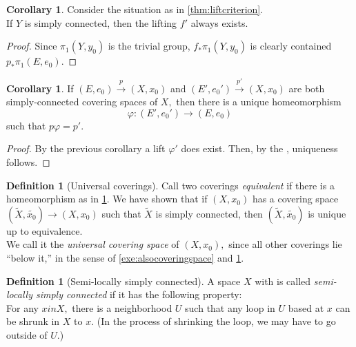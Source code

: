 \documentclass[12pt]{article}
\theoremstyle{definition}
\numberwithin{thm}{section}
\newtheorem{defn}[thm]{Definition}
\newtheorem{cor}[thm]{Corollary}
\begin{document}
\begin{cor} \label{cor:liftexists}
	Consider the situation as in \cref{thm:liftcriterion}. \\
	If $Y$ is simply connected, then the lifting $f'$ always exists.
\end{cor}
\begin{proof} 
	Since $\pi_1(Y, y_0)$ is the trivial group, $f_*\pi_1(Y, y_0)$ is clearly contained $p_*\pi_1(E, e_0).$	
\end{proof}

\begin{cor} \label{cor:equivcoverings}
	If $(E, e_0) \overset{p}{\longrightarrow} (X, x_0)$ and $(E', e_0') \overset{p'}{\longrightarrow} (X, x_0)$ are both simply-connected covering spaces of $X,$ then there is a unique homeomorphism
	\begin{equation*} 
		\varphi:(E', e_0') \to (E, e_0)
	\end{equation*}
	such that $p\varphi = p'.$
\end{cor}
\begin{proof} 
	By the previous corollary a lift $\varphi'$ does exist. Then, by the , uniqueness follows.
\end{proof}

\begin{defn}[Universal coverings]
	Call two coverings \emph{equivalent} if there is a homeomorphism as in \cref{cor:equivcoverings}. We have shown that if $(X, x_0)$ has a covering space $(\tilde{X}, \widetilde{x_0}) \to (X, x_0)$ such that $\tilde{X}$ is simply connected, then $(\tilde{X}, \widetilde{x_0})$ is unique up to equivalence.\\
	We call it the \emph{universal covering space} of $(X, x_0),$ since all other coverings lie ``below it,'' in the sense of \ref{exe:alsocoveringspace} and \ref{cor:liftexists}.
\end{defn}

\begin{defn}[Semi-locally simply connected]
	A space $X$ with is called \emph{semi-locally simply connected} if it has the following property:\\
	For any $x in X,$ there is a neighborhood $U$ such that any loop in $U$ based at $x$ can be shrunk in $X$ to $x.$ (In the process of shrinking the loop, we may have to go outside of $U.$)
\end{defn}
\end{document}
